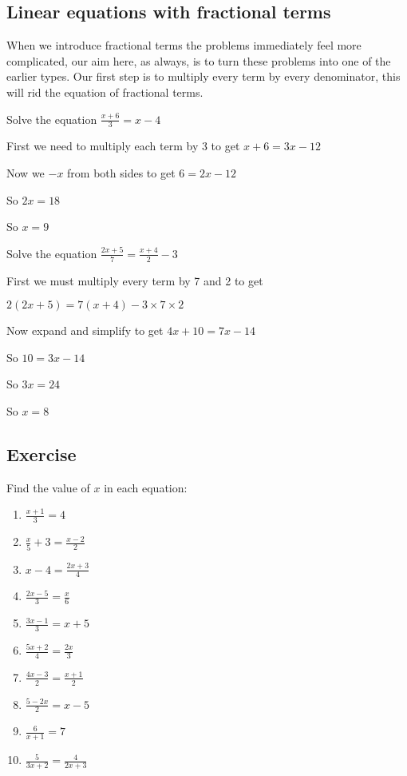 \subsection{Linear equations with fractional terms}
When we introduce fractional terms the problems immediately feel more complicated, our aim here, as always, is to turn these problems into one of the earlier types.  Our first step is to multiply every term by every denominator, this will rid the equation of fractional terms.

\begin{exmp}
Solve the equation $\displaystyle \frac{x+6}{3}=x-4$

\bigskip

First we need to multiply each term by 3 to get $x+6=3x-12$

\bigskip

Now we $-x$ from both sides to get $6=2x-12$

\bigskip

So $2x=18$

\bigskip

So $x=9$
\end{exmp}

\begin{exmp}
Solve the equation $\displaystyle \frac{2x+5}{7}=\frac{x+4}{2}-3$

\bigskip

First we must multiply every term by 7 and 2 to get 

\bigskip

$2(2x+5)=7(x+4)-3\times 7\times 2$

\bigskip

Now expand and simplify  to get $4x+10=7x-14$

\bigskip

So $10=3x-14$

\bigskip

So $3x=24$

\bigskip

So $x=8$
\end{exmp}

\subsection{Exercise}
Find the value of $x$ in each equation:
\begin{enumerate}
	\item $\displaystyle \frac{x+1}{3}=4$
	\item $\displaystyle \frac{x}{5} + 3 = \frac{x-2}{2}$
	\item $\displaystyle x-4 = \frac{2x+3}{4}$
	\item $\displaystyle \frac{2x-5}{3} = \frac{x}{6}$
	\item $\displaystyle \frac{3x-1}{3} = x + 5$
	\item $\displaystyle \frac{5x+2}{4} = \frac{2x}{3}$
	\item $\displaystyle \frac{4x-3}{2} = \frac{x+1}{2}$
	\item $\displaystyle \frac{5-2x}{2} = x-5$
	\item $\displaystyle \frac{6}{x+1}=7$
	\item $\displaystyle \frac{5}{3x+2} = \frac{4}{2x+3}$
\end{enumerate}
